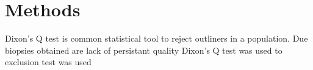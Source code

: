 \chapter{Methods}

Dixon's Q test is common statistical tool to reject outliners in a population. Due  biopsies obtained are lack of persistant quality Dixon's Q test was used to   exclusion test was used 